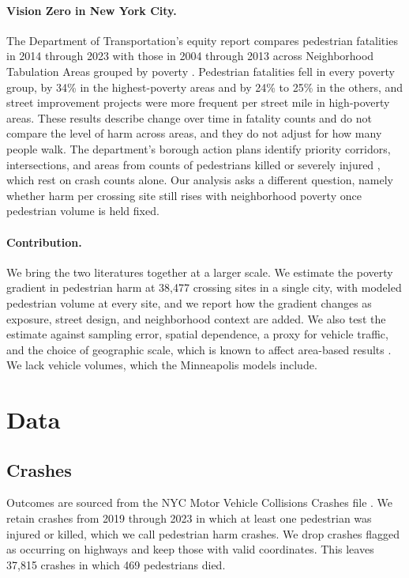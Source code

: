 \documentclass[10pt,twocolumn]{article}
\begin{document}
\paragraph{Vision Zero in New York City.} The Department of Transportation's equity report compares pedestrian fatalities in 2014 through 2023 with those in 2004 through 2013 across Neighborhood Tabulation Areas grouped by poverty \citep{nycdot2025equity}. Pedestrian fatalities fell in every poverty group, by 34\% in the highest-poverty areas and by 24\% to 25\% in the others, and street improvement projects were more frequent per street mile in high-poverty areas. These results describe change over time in fatality counts and do not compare the level of harm across areas, and they do not adjust for how many people walk. The department's borough action plans identify priority corridors, intersections, and areas from counts of pedestrians killed or severely injured \citep{nycdot2023psap}, which rest on crash counts alone. Our analysis asks a different question, namely whether harm per crossing site still rises with neighborhood poverty once pedestrian volume is held fixed.

\paragraph{Contribution.} We bring the two literatures together at a larger scale. We estimate the poverty gradient in pedestrian harm at 38,477 crossing sites in a single city, with modeled pedestrian volume at every site, and we report how the gradient changes as exposure, street design, and neighborhood context are added. We also test the estimate against sampling error, spatial dependence, a proxy for vehicle traffic, and the choice of geographic scale, which is known to affect area-based results \citep{openshaw1984maup,fotheringham1991mup}. We lack vehicle volumes, which the Minneapolis models include.

\section{Data}
\subsection{Crashes}
Outcomes are sourced from the NYC Motor Vehicle Collisions Crashes file \citep{nyc_crashes}. We retain crashes from 2019 through 2023 in which at least one pedestrian was injured or killed, which we call pedestrian harm crashes. We drop crashes flagged as occurring on highways and keep those with valid coordinates. This leaves 37,815 crashes in which 469 pedestrians died.
\end{document}
